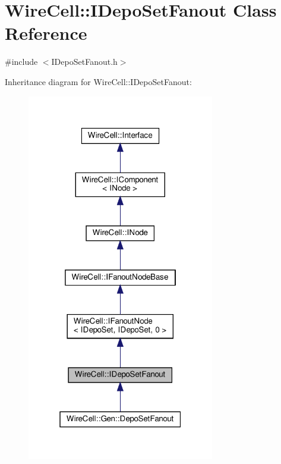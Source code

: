\hypertarget{class_wire_cell_1_1_i_depo_set_fanout}{}\section{Wire\+Cell\+:\+:I\+Depo\+Set\+Fanout Class Reference}
\label{class_wire_cell_1_1_i_depo_set_fanout}


{\ttfamily \#include $<$I\+Depo\+Set\+Fanout.\+h$>$}



Inheritance diagram for Wire\+Cell\+:\+:I\+Depo\+Set\+Fanout\+:
\nopagebreak
\begin{figure}[H]
\begin{center}
\leavevmode
\includegraphics[width=232pt]{class_wire_cell_1_1_i_depo_set_fanout__inherit__graph}
\end{center}
\end{figure}


